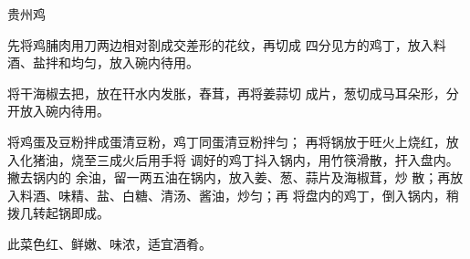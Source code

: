 \begin{recipe}{贵州鸡}

\ingredients


\cooking

\step 先将鸡脯肉用刀两边相对剳成交差形的花纹，再切成 四分见方的鸡丁，放入料酒、盐拌和均匀，放入碗内待用。

\step 将干海椒去把，放在幵水内发胀，舂茸，再将姜蒜切 成片，葱切成马耳朵形，分开放入碗内待用。

\step 将鸡蛋及豆粉拌成蛋清豆粉，鸡丁同蛋清豆粉拌匀； 再将锅放于旺火上烧红，放入化猪油，烧至三成火后用手将 调好的鸡丁抖入锅内，用竹筷滑散，扞入盘内。撇去锅内的 余油，留一两五油在锅内，放入姜、葱、蒜片及海椒茸，炒 散；再放入料酒、味精、盐、白糖、清汤、酱油，炒匀；再 将盘内的鸡丁，倒入锅内，稍拨几转起锅即成。

\notes

此菜色红、鲜嫩、味浓，适宜酒肴。

\end{recipe}

